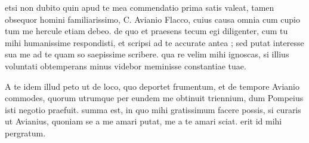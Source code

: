 


 etsi non dubito quin apud te mea commendatio prima satis valeat, tamen obsequor homini familiarissimo, C. Avianio Flacco, cuius causa omnia cum cupio tum me hercule etiam debeo. de quo et praesens tecum egi diligenter, cum tu mihi humanissime respondisti, et scripsi ad te accurate antea ; sed putat interesse sua me ad te quam so saepissime scribere. qua re velim mihi ignoscas, si illius voluntati obtemperans minus videbor meminisse constantiae tuae.

 A te idem illud peto ut de loco, quo deportet frumentum, et de tempore Avianio commodes, quorum utrumque per eundem me obtinuit triennium, dum Pompeius isti negotio praefuit. summa est, in quo mihi gratissimum facere possis, si curaris ut Avianius, quoniam se a me amari putat, me a te amari sciat. erit id mihi pergratum.
